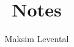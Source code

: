 \documentclass[twocolumn]{article}
\begin{document}
\title{Notes}
\author{Maksim Levental}
\maketitle
\tableofcontents

\newpage


\newpage
% 

\newpage
\printbibliography

\newpage
\printindex
\end{document}
